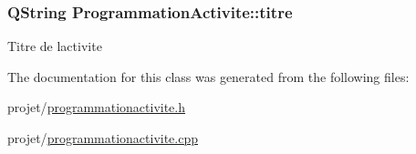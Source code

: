 \subsubsection[{titre}]{\setlength{\rightskip}{0pt plus 5cm}Q\+String Programmation\+Activite\+::titre\hspace{0.3cm}{\ttfamily [private]}}\label{class_programmation_activite_aa6f6ff264184635b35615abb4e45ab62}
Titre de l\textquotesingle{}activite 

The documentation for this class was generated from the following files\+:\begin{DoxyCompactItemize}
\item 
projet/\hyperlink{programmationactivite_8h}{programmationactivite.\+h}\item 
projet/\hyperlink{programmationactivite_8cpp}{programmationactivite.\+cpp}\end{DoxyCompactItemize}
